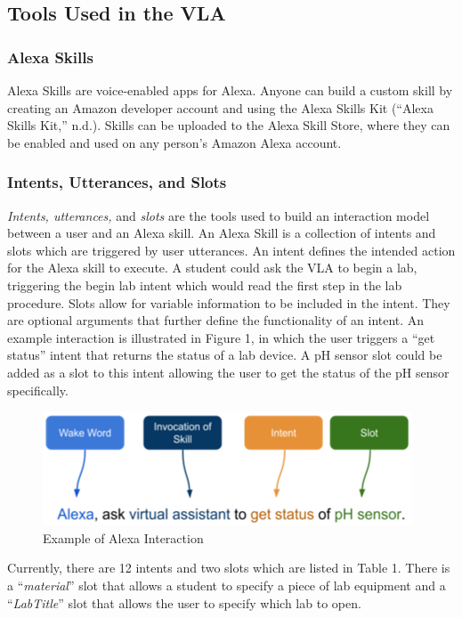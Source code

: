 \documentclass[11.5pt]{sig-alternate} %
\begin{document}
\begin{large}
\subsection*{Tools Used in the VLA}

\subsubsection*{Alexa Skills}

Alexa Skills are voice-enabled apps for Alexa. Anyone can build a custom skill by creating an Amazon developer account and using the Alexa Skills Kit (“Alexa Skills Kit,” n.d.). Skills can be uploaded to the Alexa Skill Store, where they can be enabled and used on any person's Amazon Alexa account.

\subsubsection*{Intents, Utterances, and Slots}

\textit{Intents, utterances,} and \textit{slots} are the tools used to build an interaction model between a user and an Alexa skill. An Alexa Skill is a collection of intents and slots which are triggered by user utterances. An intent defines the intended action for the Alexa skill to execute. A student could ask the VLA to begin a lab, triggering the begin lab intent which would read the first step in the lab procedure. Slots allow for variable information to be included in the intent. They are optional arguments that further define the functionality of an intent. An example interaction is illustrated in Figure 1, in which the user triggers a “get status” intent that returns the status of a lab device. A pH sensor slot could be added as a slot to this intent allowing the user to get the status of the pH sensor specifically.

\begin{figure}[h]
    \centering
    \includegraphics[width=1\linewidth]{fig1.png}
    \caption{Example of Alexa Interaction}
\end{figure}
Currently, there are 12 intents and two slots which are listed in Table 1. There is a “\textit{material}” slot that allows a student to specify a piece of lab equipment and a “\textit{LabTitle}” slot that allows the user to specify which lab to open. 


\end{large}
\end{document}
